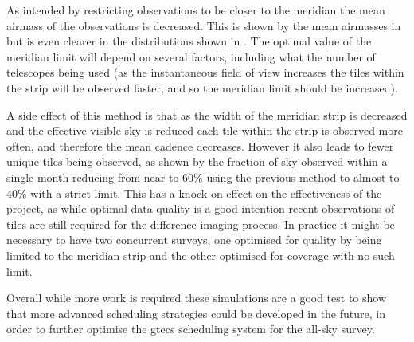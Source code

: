 \begin{colsection}
\begin{colsection}
As intended by restricting observations to be closer to the meridian the mean airmass of the observations is decreased. This is shown by the mean airmasses in  but is even clearer in the distributions shown in . The optimal value of the meridian limit will depend on several factors, including what the number of telescopes being used (as the instantaneous field of view increases the tiles within the strip will be observed faster, and so the meridian limit should be increased).

A side effect of this method is that as the width of the meridian strip is decreased and the effective visible sky is reduced each tile within the strip is observed more often, and therefore the mean cadence decreases. However it also leads to fewer unique tiles being observed, as shown by the fraction of sky observed within a single month reducing from near to 60\% using the previous method to almost to 40\% with a strict limit. This has a knock-on effect on the effectiveness of the project, as while optimal data quality is a good intention recent observations of tiles are still required for the difference imaging process. In practice it might be necessary to have two concurrent surveys, one optimised for quality by being limited to the meridian strip and the other optimised for coverage with no such limit.

Overall while more work is required these simulations are a good test to show that more advanced scheduling strategies could be developed in the future, in order to further optimise the \gls{gtecs} scheduling system for the all-sky survey.

\end{colsection}


\end{colsection}

